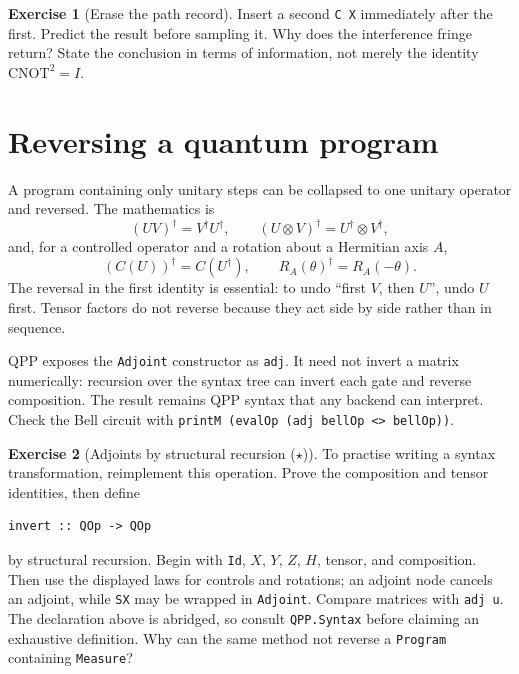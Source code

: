 \documentclass[11pt,a4paper]{article}
\theoremstyle{definition}
\newtheorem{exercise}{Exercise}[section]
\begin{document}
\begin{exercise}[Erase the path record]
Insert a second \lstinline|C X| immediately after the first.  Predict the
result before sampling it.  Why does the interference fringe return?  State
the conclusion in terms of information, not merely the identity
$\mathrm{CNOT}^2=I$.
\end{exercise}

\section{Reversing a quantum program}
\label{sec:reversal}

A program containing only unitary steps can be collapsed to one unitary
operator and reversed.  The mathematics is
\[
  (UV)^\dagger=V^\dagger U^\dagger,
  \qquad
  (U\otimes V)^\dagger=U^\dagger\otimes V^\dagger,
\]
and, for a controlled operator and a rotation about a Hermitian axis $A$,
\[
  (C(U))^\dagger=C(U^\dagger),\qquad
  R_A(\theta)^\dagger=R_A(-\theta).
\]
The reversal in the first identity is essential: to undo ``first $V$, then
$U$'', undo $U$ first.  Tensor factors do not reverse because they act side
by side rather than in sequence.

QPP exposes the \lstinline|Adjoint| constructor as \lstinline|adj|.  It need
not invert a matrix numerically: recursion over the syntax tree can invert
each gate and reverse composition.  The result remains QPP syntax that any
backend can interpret.  Check the Bell circuit with
\lstinline|printM (evalOp (adj bellOp <> bellOp))|.

\begin{exercise}[Adjoints by structural recursion ($\star$)]
To practise writing a syntax transformation, reimplement this operation.
Prove the composition and tensor identities, then define
\begin{lstlisting}
invert :: QOp -> QOp
\end{lstlisting}
by structural recursion.  Begin with \lstinline|Id|, $X$, $Y$, $Z$, $H$,
tensor, and composition.  Then use the displayed laws for controls and
rotations; an adjoint node cancels an adjoint, while \lstinline|SX| may be
wrapped in \lstinline|Adjoint|.  Compare matrices with \lstinline|adj u|.
The declaration above is abridged, so consult \lstinline|QPP.Syntax| before
claiming an exhaustive definition.  Why can the same method not reverse a
\lstinline|Program| containing \lstinline|Measure|?
\end{exercise}
\end{document}
